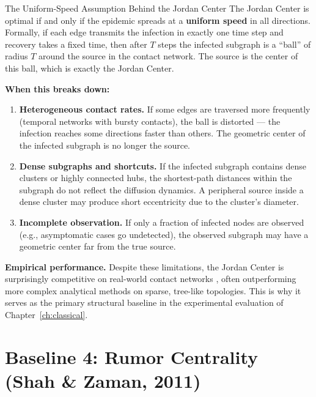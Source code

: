 \begin{keyinsight}{The Uniform-Speed Assumption Behind the Jordan Center}
The Jordan Center is optimal if and only if the epidemic spreads at a \textbf{uniform
speed} in all directions. Formally, if each edge transmits the infection in exactly one
time step and recovery takes a fixed time, then after $T$ steps the infected subgraph
is a ``ball'' of radius $T$ around the source in the contact network. The source is
the center of this ball, which is exactly the Jordan Center.

\medskip
\textbf{When this breaks down:}
\begin{enumerate}
  \item \textbf{Heterogeneous contact rates.} If some edges are traversed more
        frequently (temporal networks with bursty contacts), the ball is distorted ---
        the infection reaches some directions faster than others. The geometric center
        of the infected subgraph is no longer the source.
  \item \textbf{Dense subgraphs and shortcuts.} If the infected subgraph contains
        dense clusters or highly connected hubs, the shortest-path distances within the
        subgraph do not reflect the diffusion dynamics. A peripheral source inside a
        dense cluster may produce short eccentricity due to the cluster's diameter.
  \item \textbf{Incomplete observation.} If only a fraction of infected nodes are
        observed (e.g., asymptomatic cases go undetected), the observed subgraph may
        have a geometric center far from the true source.
\end{enumerate}

\medskip
\textbf{Empirical performance.} Despite these limitations, the Jordan Center is
surprisingly competitive on real-world contact networks \cite{Sterchi2025}, often
outperforming more complex analytical methods on sparse, tree-like topologies. This is
why it serves as the primary structural baseline in the experimental evaluation of
Chapter~\ref{ch:classical}.
\end{keyinsight}

\section{Baseline 4: Rumor Centrality (Shah \& Zaman, 2011)}
\label{sec:rumor}


